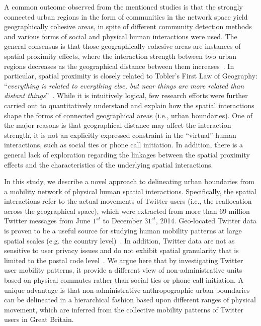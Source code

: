 \documentclass[]{tGIS2e}
\begin{document}
A common outcome observed from the mentioned studies is that the strongly connected urban regions in the form of communities in the network space yield geographically cohesive areas, in spite of different community detection methods and various forms of social and physical human interactions were used.
The general consensus is that those geographically cohesive areas are instances of spatial proximity effects, where the interaction strength between two urban regions decreases as the geographical distance between them increases~\citep{fotheringham1981}.
In particular, spatial proximity is closely related to Tobler's First Law of Geography: ``\textit{everything is related to everything else, but near things are more related than distant things}''~\citep{miller2004}.
While it is intuitively logical, few research efforts were further carried out to quantitatively understand and explain how the spatial interactions shape the forms of connected geographical areas (i.e., urban boundaries). 
One of the major reasons is that geographical distance may affect the interaction strength, it is not an explicitly expressed constraint in the ``virtual'' human interactions, such as social ties or phone call initiation.
In addition, there is a general lack of exploration regarding the linkages between the spatial proximity effects and the characteristics of the underlying spatial interactions. 

In this study, we describe a novel approach to delineating urban boundaries from a mobility network of physical human spatial interactions.
Specifically, the spatial interactions refer to the actual movements of Twitter users (i.e., the reallocation across the geographical space), which were extracted from more than 69 million Twitter messages from June $1^{st}$ to December $31^{st}$, 2014.
Geo-located Twitter data is proven to be a useful source for studying human mobility patterns at large spatial scales (e.g. the country level)~\citep{hawelka,jurdak2015}.
In addition, Twitter data are not as sensitive to user privacy issues and do not exhibit spatial granularity that is limited to the postal code level~\citep{thiemann}. 
We argue here that by investigating Twitter user mobility patterns, it provide a different view of non-administrative units based on physical commutes rather than social ties or phone call initiation. 
A unique advantage is that non-administrative anthropographic urban boundaries can be delineated in a hierarchical fashion based upon different ranges of physical movement, which are inferred from the collective mobility patterns of Twitter users in Great Britain. 
\end{document}
